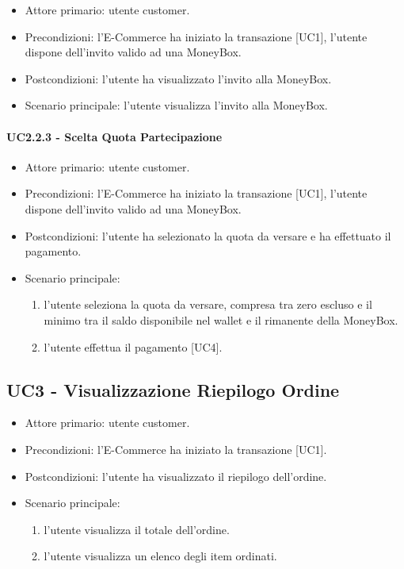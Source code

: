 \begin{itemize}
    \item Attore primario: utente customer.
    \item Precondizioni: l'E-Commerce ha iniziato la transazione [UC1], l'utente dispone dell'invito valido ad una MoneyBox.
    \item Postcondizioni: l'utente ha visualizzato l'invito alla MoneyBox.
    \item Scenario principale: l'utente visualizza l'invito alla MoneyBox.
\end{itemize}

\paragraph{UC2.2.3 - Scelta Quota Partecipazione}

\begin{itemize}
    \item Attore primario: utente customer.
    \item Precondizioni: l'E-Commerce ha iniziato la transazione [UC1], l'utente dispone dell'invito valido ad una MoneyBox.
    \item Postcondizioni: l'utente ha selezionato la quota da versare e ha effettuato il pagamento.
    \item Scenario principale:\begin{enumerate}
        \item l'utente seleziona la quota da versare, compresa tra zero escluso e il minimo tra il saldo disponibile nel wallet e il rimanente della MoneyBox.
        \item l'utente effettua il pagamento [UC4].
    \end{enumerate}
\end{itemize}

\subsection{UC3 - Visualizzazione Riepilogo Ordine}

\begin{itemize}
    \item Attore primario: utente customer.
    \item Precondizioni: l'E-Commerce ha iniziato la transazione [UC1].
    \item Postcondizioni: l'utente ha visualizzato il riepilogo dell'ordine.
    \item Scenario principale: \begin{enumerate}
        \item l'utente visualizza il totale dell'ordine.
        \item l'utente visualizza un elenco degli item ordinati.
    \end{enumerate}
\end{itemize}

